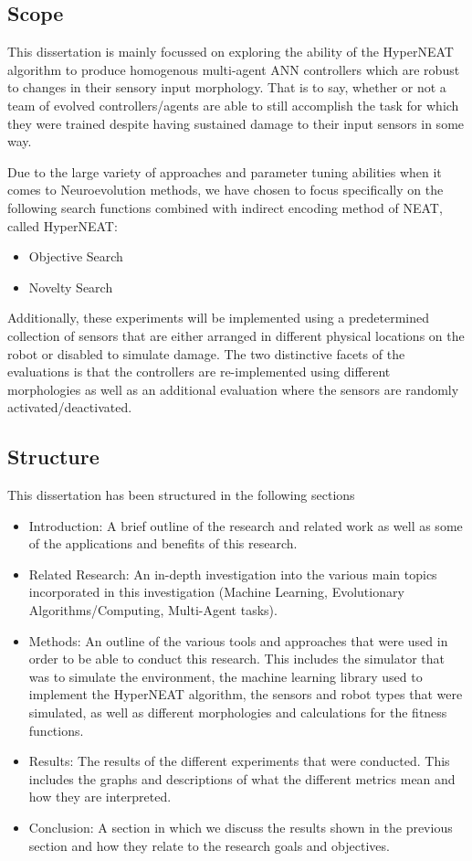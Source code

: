 \subsection{Scope}

This dissertation is mainly focussed on exploring the ability of the HyperNEAT algorithm to produce homogenous multi-agent ANN controllers which are robust to changes in their sensory input morphology. That is to say, whether or not a team of evolved controllers/agents are able to still accomplish the task for which they were trained despite having sustained damage to their input sensors in some way.

Due to the large variety of approaches and parameter tuning abilities when it comes to Neuroevolution methods, we have chosen to focus specifically on the following search functions combined with indirect encoding method of NEAT, called HyperNEAT:
\begin{itemize}
	\item Objective Search
	\item Novelty Search
\end{itemize}

Additionally, these experiments will be implemented using a predetermined collection of sensors that are either arranged in different physical locations on the robot or disabled to simulate damage.  The two distinctive facets of the evaluations is that the controllers are re-implemented using different morphologies as well as an additional evaluation where the sensors are randomly activated/deactivated.

\subsection{Structure}
This dissertation has been structured in the following sections
\begin{itemize}
	\item Introduction: A brief outline of the research and related work as well as some of the applications and benefits of this research.
	\item Related Research: An in-depth investigation into the various main topics incorporated in this investigation (Machine Learning, Evolutionary Algorithms/Computing, Multi-Agent tasks).
	\item Methods: An outline of the various tools and approaches that were used in order to be able to conduct this research. This includes the simulator that was to simulate the environment, the machine learning library used to implement the HyperNEAT algorithm, the sensors and robot types that were simulated, as well as different morphologies and calculations for the fitness functions.
	\item Results: The results of the different experiments that were conducted. This includes the graphs and descriptions of what the different metrics mean and how they are interpreted.
	\item Conclusion: A section in which we discuss the results shown in the previous section and how they relate to the research goals and objectives.
\end{itemize}



